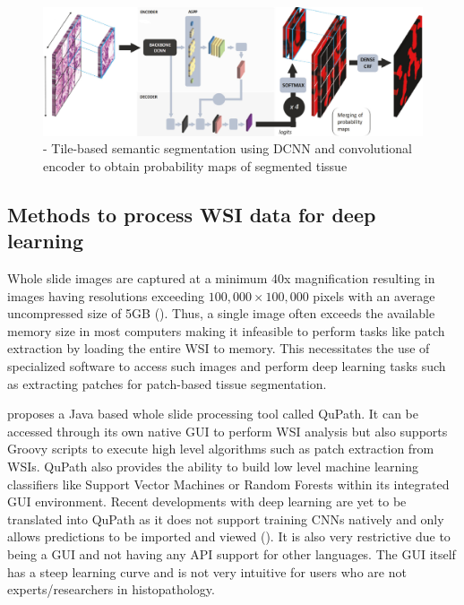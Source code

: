 \documentclass{l4proj}
\begin{document}
\begin{figure}[h]
    \centering
    \includegraphics[scale=0.4]{images/Priego-DCNN-encoder-arch.png}
    \caption{\cite{priego2020automatic} - Tile-based semantic segmentation using DCNN and convolutional encoder to obtain probability maps of segmented tissue}
    \label{fig:Priego-conv-pipeline}
\end{figure}

\subsection{Methods to process WSI data for deep learning} \label{background-openslide}
Whole slide images are captured at a minimum 40x magnification resulting in images having resolutions exceeding \(100,000 \times 100,000\) pixels with an average uncompressed size of 5GB (\cite{bandi2018detection}). Thus, a single image often exceeds the available memory size in most computers making it infeasible to perform tasks like patch extraction by loading the entire WSI to memory. This necessitates the use of specialized software to access such images and perform deep learning tasks such as extracting patches for patch-based tissue segmentation.

\cite{bankhead2017qupath} proposes a Java based whole slide processing tool called QuPath. It can be accessed through its own native GUI to perform WSI analysis but also supports Groovy scripts to execute high level algorithms such as patch extraction from WSIs. QuPath also provides the ability to build low level machine learning classifiers like Support Vector Machines or Random Forests within its integrated GUI environment. Recent developments with deep learning are yet to be translated into QuPath as it does not support  training CNNs natively and only allows predictions to be imported and viewed (\cite{pedersen2021fastpathology}). It is also very restrictive due to being a GUI and not having any API support for other languages. The GUI itself has a steep learning curve and is not very intuitive for users who are not experts/researchers in histopathology. 
\end{document}
